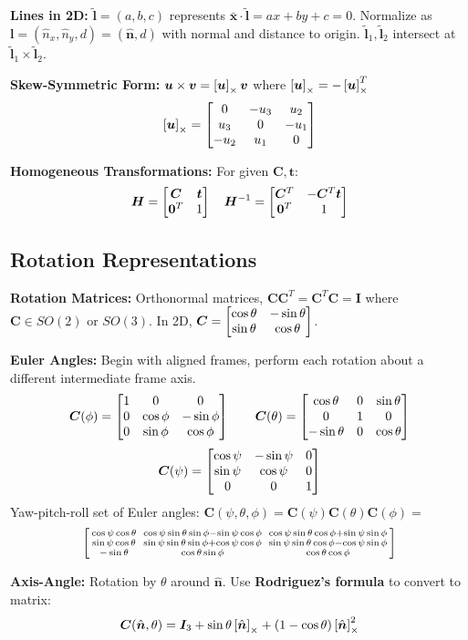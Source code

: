 \documentclass[twocolumn, 10pt]{extarticle}
\begin{document}
\textbf{Lines in 2D:} \(\tilde{\bm l} = (a, b, c)\) represents \(\bar{\bm x} \cdot \tilde{\bm l} = ax + by + c = 0\).
Normalize as \(\bm l = (\hat n_x, \hat n_y, d) = (\hat{\bm n}, d)\) with normal and distance to origin.
\(\tilde{\bm l}_1, \tilde{\bm l}_2\) intersect at \(\tilde{\bm l}_1 \times \tilde{\bm l}_2\).

\textbf{Skew-Symmetric Form:} \(\bm u \times \bm v = \left[\bm u\right]_{\times}\bm v\) where \(\left[\bm u\right]_{\times} = -\left[\bm u\right]_{\times}^T\)
\[\skewsym{\bm u} = \matthree{0}{-u_3}{u_2}{u_3}{0}{-u_1}{-u_2}{u_1}{0}\]

\textbf{Homogeneous Transformations:} For given \(\bm C, \bm t\):
\[\bm H = \begin{bmatrix} {\bm C} & {\bm t} \\ {\bm 0^T} & {1} \end{bmatrix} \quad \bm H^{-1} = \begin{bmatrix} {\bm C^T} & {-\bm C^T\bm t} \\ {\bm 0^T} & {1} \end{bmatrix}\]

\subsection{Rotation Representations}

\textbf{Rotation Matrices:} Orthonormal matrices, \(\bm C\bm C^T = \bm C^T\bm C = \bm I\) where \(\bm C \in SO(2)\) or
\(SO(3)\). In 2D, \(\bm C = \begin{bmatrix} {\cos\theta} & {-\sin\theta} \\ {\sin\theta} & {\cos\theta} \end{bmatrix}\).

\textbf{Euler Angles:} Begin with aligned frames, perform each rotation about a different intermediate frame axis.
\[
\bm C(\phi) = \matthree{1}{0}{0}{0}{\cos\phi}{-\sin\phi}{0}{\sin\phi}{\cos\phi} \qquad
\bm C(\theta) = \matthree{\cos\theta}{0}{\sin\theta}{0}{1}{0}{-\sin\theta}{0}{\cos\theta}
\]
\[
\bm C(\psi) = \matthree{\cos\psi}{-\sin\psi}{0}{\sin\psi}{\cos\psi}{0}{0}{0}{1}
\]
Yaw-pitch-roll set of Euler angles: \(\bm C(\psi, \theta, \phi) = \bm C(\psi)\bm C(\theta)\bm C(\phi) =\)
\[
\begin{bsmallmatrix}
\cos\psi\cos\theta && \cos\psi\sin\theta\sin\phi - \sin\psi\cos\phi && \cos\psi\sin\theta\cos\phi + \sin\psi\sin\phi \\
\sin\psi\cos\theta && \sin\psi\sin\theta\sin\phi + \cos\psi\cos\phi && \sin\psi\sin\theta\cos\phi - \cos\psi\sin\phi \\
-\sin\theta && \cos\theta\sin\phi && \cos\theta\cos\phi
\end{bsmallmatrix}
\]

\textbf{Axis-Angle:} Rotation by \(\theta\) around \(\hat{\bm n}\). Use \textbf{Rodriguez's formula} to convert to
matrix: \[\bm C(\hat{\bm n}, \theta) = \bm I_3 + \sin\theta\left[\hat{\bm n}\right]_{\times} + (1 - \cos\theta)\left[\hat{\bm n}\right]_{\times}^2\]
\end{document}

